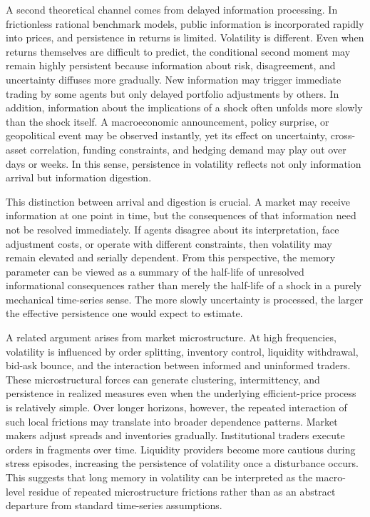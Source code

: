 \documentclass[12pt]{article}
\begin{document}
A second theoretical channel comes from delayed information processing. In frictionless rational benchmark models, public information is incorporated rapidly into prices, and persistence in returns is limited. Volatility is different. Even when returns themselves are difficult to predict, the conditional second moment may remain highly persistent because information about risk, disagreement, and uncertainty diffuses more gradually. New information may trigger immediate trading by some agents but only delayed portfolio adjustments by others. In addition, information about the implications of a shock often unfolds more slowly than the shock itself. A macroeconomic announcement, policy surprise, or geopolitical event may be observed instantly, yet its effect on uncertainty, cross-asset correlation, funding constraints, and hedging demand may play out over days or weeks. In this sense, persistence in volatility reflects not only information arrival but information digestion.

This distinction between arrival and digestion is crucial. A market may receive information at one point in time, but the consequences of that information need not be resolved immediately. If agents disagree about its interpretation, face adjustment costs, or operate with different constraints, then volatility may remain elevated and serially dependent. From this perspective, the memory parameter can be viewed as a summary of the half-life of unresolved informational consequences rather than merely the half-life of a shock in a purely mechanical time-series sense. The more slowly uncertainty is processed, the larger the effective persistence one would expect to estimate.

A related argument arises from market microstructure. At high frequencies, volatility is influenced by order splitting, inventory control, liquidity withdrawal, bid-ask bounce, and the interaction between informed and uninformed traders. These microstructural forces can generate clustering, intermittency, and persistence in realized measures even when the underlying efficient-price process is relatively simple. Over longer horizons, however, the repeated interaction of such local frictions may translate into broader dependence patterns. Market makers adjust spreads and inventories gradually. Institutional traders execute orders in fragments over time. Liquidity providers become more cautious during stress episodes, increasing the persistence of volatility once a disturbance occurs. This suggests that long memory in volatility can be interpreted as the macro-level residue of repeated microstructure frictions rather than as an abstract departure from standard time-series assumptions.
\end{document}
